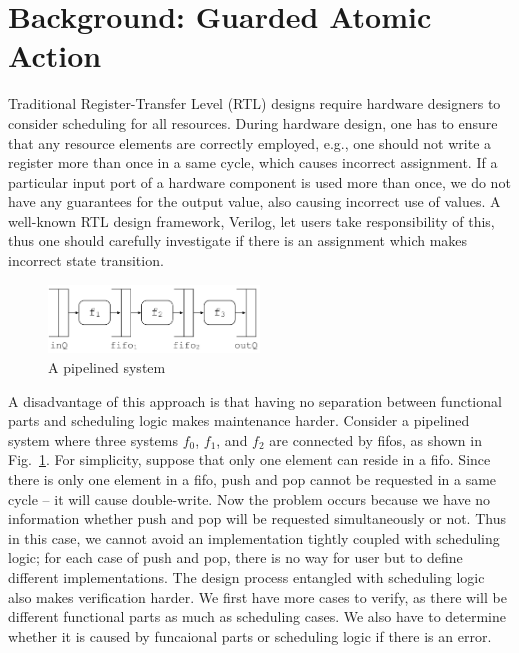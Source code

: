 \section{Background: Guarded Atomic Action}\label{sec:background}
Traditional Register-Transfer Level (RTL) designs require hardware
designers to consider scheduling for all resources. During hardware
design, one has to ensure that any resource elements are correctly
employed, e.g., one should not write a register more than once in a
same cycle, which causes incorrect assignment. If a particular input
port of a hardware component is used more than once, we do not have
any guarantees for the output value, also causing incorrect use of
values. A well-known RTL design framework, Verilog, let users take
responsibility of this, thus one should carefully investigate if there
is an assignment which makes incorrect state transition.
\begin{figure}[h]
  \centering
  \includegraphics[width=0.5\textwidth]{figures/pipeline.pdf}
  \caption{A pipelined system}
  \label{fig:pipeline}
\end{figure}

A disadvantage of this approach is that having no separation between
functional parts and scheduling logic makes maintenance
harder. Consider a pipelined system where three systems $f_0$, $f_1$,
and $f_2$ are connected by fifos, as shown in
Fig.~\ref{fig:pipeline}. For simplicity, suppose that only one element
can reside in a fifo. Since there is only one element in a fifo, push
and pop cannot be requested in a same cycle -- it will cause
double-write. Now the problem occurs because we have no information
whether push and pop will be requested simultaneously or not. Thus in
this case, we cannot avoid an implementation tightly coupled with
scheduling logic; for each case of push and pop, there is no way for
user but to define different implementations. The design process
entangled with scheduling logic also makes verification harder. We
first have more cases to verify, as there will be different functional
parts as much as scheduling cases. We also have to determine whether
it is caused by funcaional parts or scheduling logic if there is an
error.

